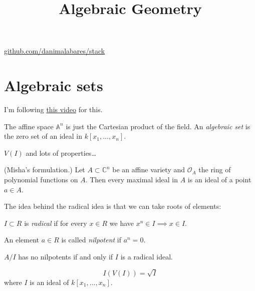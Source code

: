 



\title{Algebraic Geometry}
\maketitle

\label{section-phantom}
\hfill
\href{http://github.com/danimalabares/stack}{github.com/danimalabares/stack}

\tableofcontents

\section{Algebraic sets}
\label{section-algebraic-sets}

\noindent
I'm following \href{https://www.youtube.com/watch?v=C6XR9DrQnoQ}{this video}
for this.

\medskip\noindent
The affine space $\mathbb{A}^n$ is just the Cartesian
product of the field.
An {\it algebraic set} is the zero set of an ideal
in $k[x_1,…,x_n]$.

$V(I)$ and lots of properties…

\begin{theorem}
\label{theorem-weak-nullstellensatz}
(Misha's formulation.) Let $A \subset \mathbb{C}^n$
be an affine variety and $\mathcal{O}_A$ the ring of polynomial
functions on $A$.
Then every maximal ideal in $A$
is an ideal of a point $a \in A$.
\end{theorem}

\noindent
The idea behind the radical idea is that
we can take roots of elements:

\begin{definition}
\label{definition-radical-ideal}
$I \subset R$ is {\it radical} 
if for every $x \in R$ we have $x^n \in I \implies x \in I$.
\end{definition}


\begin{definition}
\label{definition-nilpotent}
An element $a \in R$ is called {\it nilpotent} 
if $a^n = 0$.
\end{definition}

\begin{exercise}
\label{exercise-no-nilpotents-iff-radical}
$A/I$ has no nilpotents if and only if $I$ is a radical ideal.
\end{exercise}

\begin{theorem}[Nullstellensatz]
\label{theorem-nullstellensatz}
$$
I(V(I))=\sqrt{I}
$$
where $I$ is an ideal of $k[x_1,…,x_n]$.
\end{theorem}


